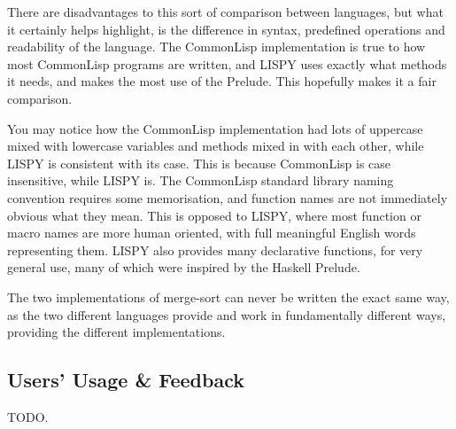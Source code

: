 \documentclass{article}
\begin{document}
    There are disadvantages to this sort of comparison between languages, but
    what it certainly helps highlight, is the difference in syntax, predefined
    operations and readability of the language. The CommonLisp implementation is
    true to how most CommonLisp programs are written, and LISPY uses exactly
    what methods it needs, and makes the most use of the Prelude. This hopefully
    makes it a fair comparison.

    You may notice how the CommonLisp implementation had lots of uppercase mixed
    with lowercase variables and methods mixed in with each other, while LISPY
    is consistent with its case. This is because CommonLisp is case insensitive,
    while LISPY is. The CommonLisp standard library naming convention requires
    some memorisation, and function names are not immediately obvious what they
    mean. This is opposed to LISPY, where most function or macro names are more
    human oriented, with full meaningful English words representing them.
    LISPY also provides many declarative functions, for very general use, many
    of which were inspired by the Haskell Prelude.

    The two implementations of merge-sort can never be written the exact same
    way, as the two different languages provide and work in fundamentally
    different ways, providing the different implementations.

    \clearpage

  \subsection{Users' Usage \& Feedback}
    TODO.

  \clearpage
  \let\Section\section
  \def\section*#1{\Section{#1}}

  \printbibliography
\end{document}
